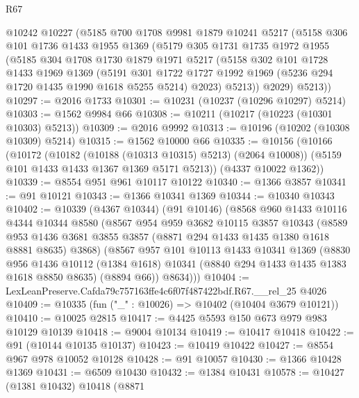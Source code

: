 \begin{lexlean}{R67}
\begin{coremodule}
    @10242
    @10227
    (@5185
      @700
      @1708
      @9981
      @1879
      @10241
      @5217
      (@5158
        @306
        @101
        @1736
        @1433
        @1955
        @1369
        (@5179
          @305
          @1731
          @1735
          @1972
          @1955
          (@5185
            @304
            @1708
            @1730
            @1879
            @1971
            @5217
            (@5158
              @302
              @101
              @1728
              @1433
              @1969
              @1369
              (@5191
                @301
                @1722
                @1727
                @1992
                @1969
                (@5236 @294 @1720 @1435 @1990 @1618 @5255 @5214)
                @2023)
              @5213))
          @2029)
        @5213))
@10297 := @2016 @1733
@10301 := @10231 (@10237 (@10296 @10297) @5214)
@10303 := @1562 @9984 @66
@10308 := @10211 (@10217 (@10223 (@10301 @10303) @5213))
@10309 := @2016 @9992
@10313 := @10196 (@10202 (@10308 @10309) @5214)
@10315 := @1562 @10000 @66
@10335 := @10156
    (@10166
      (@10172
        (@10182 (@10188 (@10313 @10315) @5213) (@2064 @10008))
        (@5159 @101 @1433 @1433 @1367 @1369 @5171 @5213))
      (@4337 @10022 @1362))
@10339 := @8554 @951 @961 @10117 @10122
@10340 := @1366 @3857
@10341 := @91 @10121
@10343 := @1366 @10341 @1369
@10344 := @10340 @10343
@10402 := @10339
    (@4367 @10344)
    (@91 @10146)
    (@8568
      @960
      @1433
      @10116
      @4344
      @10344
      @8580
      (@8567
        @954
        @959
        @3682
        @10115
        @3857
        @10343
        (@8589 @953 @1436 @3681 @3855 @3857 (@8871 @294 @1433 @1435 @1380 @1618 @8881 @8635) @3868)
        (@8567
          @957
          @101
          @10113
          @1433
          @10341
          @1369
          (@8830
            @956
            @1436
            @10112
            (@1384 @1618)
            @10341
            (@8840 @294 @1433 @1435 @1383 @1618 @8850 @8635)
            (@8894 @66))
          @8634)))
@10404 := LexLeanPreserve.Cafda79c757163ffe4c6f07f487422bdf.R67.__rel_25 @4026
@10409 := @10335 (fun ("_" : @10026) => @10402 (@10404 @3679 @10121))
@10410 := @10025 @2815
@10417 := @4425 @5593 @150 @673 @979 @983 @10129 @10139
@10418 := @9004 @10134
@10419 := @10417 @10418
@10422 := @91 (@10144 @10135 @10137)
@10423 := @10419 @10422
@10427 := @8554 @967 @978 @10052 @10128
@10428 := @91 @10057
@10430 := @1366 @10428 @1369
@10431 := @6509 @10430
@10432 := @1384 @10431
@10578 := @10427
    (@1381 @10432)
    @10418
    (@8871

\end{coremodule}
\end{lexlean}
